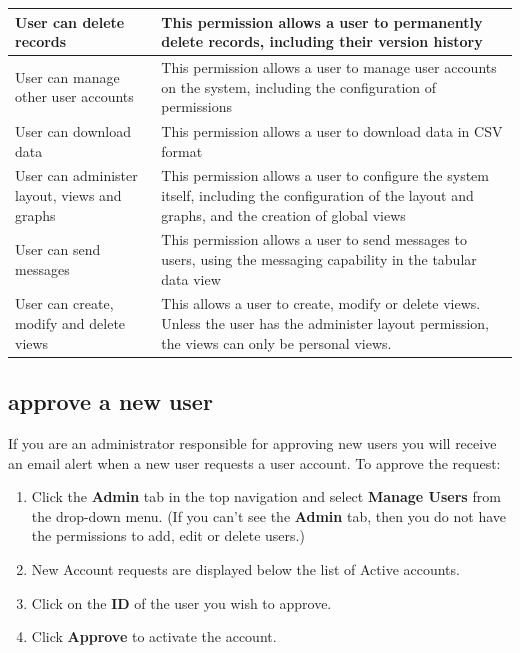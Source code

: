 \documentclass{ctrlo-int-toc}
\begin{document}
\begin{admin}
\begin{flushleft}
\tablefirsthead{}
\tablehead{}
\tabletail{}
\tablelasttail{}
\begin{supertabular}{|m{3.046cm}|m{10.915cm}|}
\hline
User can delete records &
This permission allows a user to permanently delete records, including their version history \ \\\hline
User can manage other user accounts &
This permission allows a user to manage user accounts on the system, including the configuration of permissions \\\hline
User can download data &
This permission allows a user to download data in CSV format \\\hline
User can administer layout, views and graphs &
This permission allows a user to configure the system itself, including the configuration of the layout and graphs, and the creation of global views \\\hline
User can send messages &
This permission allows a user to send messages to users, using the messaging capability in the tabular data view \ \\\hline
User can create, modify and delete views &
This allows a user to create, modify or delete views. Unless the user has the administer layout permission, the views can only be personal views. \ \\\hline
\end{supertabular}
\end{flushleft}

\subsection[approve a new user ]{approve a new user }
If you are an administrator responsible for approving new users you will receive an email alert when a new user requests a user account. To approve the request:

\begin{enumerate}
    \item Click the \textbf{Admin} tab in the top navigation and select \textbf{Manage Users} from the drop-down menu. (If you can't see the \textbf{Admin} tab, then you do not have the permissions to add, edit or delete users.)
\item New Account requests are displayed below the list of Active accounts.
\item Click on the \textbf{ID} of the user you wish to approve.
\item Click \textbf{Approve} to activate the account.
\end{enumerate}

\end{admin}
\end{document}
